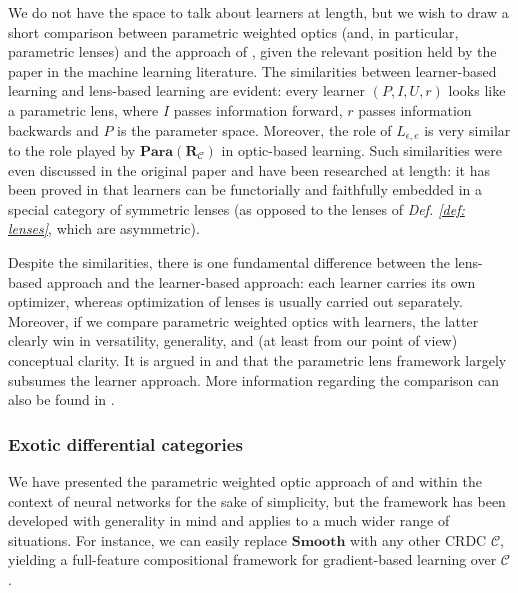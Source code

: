 \documentclass[12pt,a4paper,openright,twoside]{report}
\theoremstyle{plain}
\theoremstyle{definition}
\begin{document}
We do not have the space to talk about learners at length, but we wish to draw a short comparison between parametric weighted optics (and, in particular, parametric lenses) and the approach of \cite{fong2019backprop}, given the relevant position held by the paper in the machine learning literature. The similarities between learner-based learning and lens-based learning are evident: every learner $(P, I, U, r)$ looks like a parametric lens, where $I$ passes information forward, $r$ passes information backwards and $P$ is the parameter space. Moreover, the role of $L_{\epsilon, e}$ is very similar to the role played by $\mathbf{Para}(\mathbf{R}_{\mathcal{C}})$ in optic-based learning. Such similarities were even discussed in the original paper \cite{fong2019backprop} and have been researched at length: it has been proved in \cite{fong2019lenses} that learners can be functorially and faithfully embedded in a special category of symmetric lenses (as opposed to the lenses of \textit{Def. \ref{def: lenses}}, which are asymmetric).


Despite the similarities, there is one fundamental difference between the lens-based approach and the learner-based approach: each learner carries its own optimizer, whereas optimization of lenses is usually carried out separately. Moreover, if we compare parametric weighted optics with learners, the latter clearly win in versatility, generality, and (at least from our point of view) conceptual clarity. It is argued in \cite{shiebler2021category} and \cite{cruttwell2022categorical} that the parametric lens framework largely subsumes the learner approach. More information regarding the comparison can also be found in \cite{gavranovic2024fundamental}.


\subsubsection{Exotic differential categories}

We have presented the parametric weighted optic approach of \cite{gavranovic2024fundamental} and \cite{cruttwell2022categorical} within the context of neural networks for the sake of simplicity, but the framework has been developed with generality in mind and applies to a much wider range of situations. For instance, we can easily replace $\mathbf{Smooth}$ with any other CRDC $\mathcal{C}$, yielding a full-feature compositional framework for gradient-based learning over $\mathcal{C}$.
\end{document}
